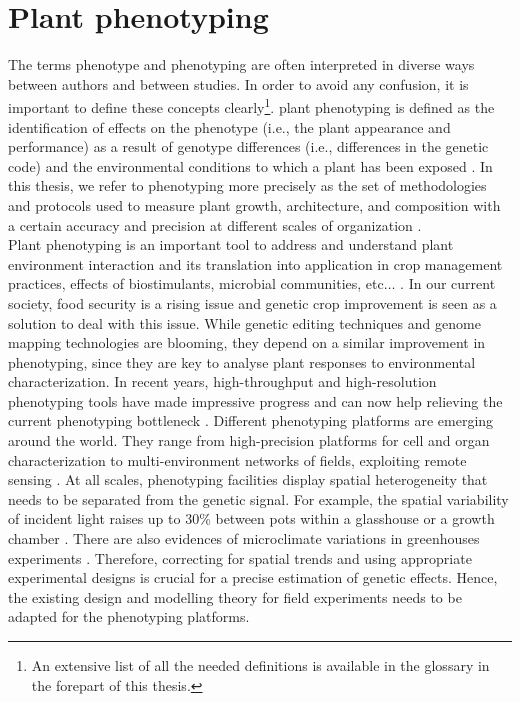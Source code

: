 \section{Plant phenotyping}
The terms phenotype and phenotyping are often interpreted in diverse ways between authors and between studies. In order to avoid any confusion, it is important to define these concepts clearly\footnote{An extensive list of all the needed definitions is available in the glossary in the forepart of this thesis.}.
plant phenotyping is defined as the identification of effects on the phenotype (i.e., the plant appearance and performance) as a result of genotype differences (i.e., differences in the genetic code) and the environmental conditions to which a plant has been exposed \parencite{houle_phenomics:_2010,fiorani_future_2013}. In this thesis, we refer to phenotyping more precisely as the set of methodologies and protocols used to measure plant growth, architecture, and composition with a certain accuracy and precision at different scales of organization \parencite{fiorani_future_2013}.\\
Plant phenotyping is an important tool to address and understand plant environment interaction and its translation into
application in crop management practices, effects of biostimulants, microbial communities, etc$\ldots$
\parencite{pieruschka2019plant}. 
In our current society, food security is a rising issue and genetic crop improvement is seen as a solution to deal with this issue. While genetic editing techniques and genome mapping technologies are blooming, they depend on a similar improvement in phenotyping, since they are key to analyse plant responses to environmental characterization.
In recent years, high-throughput and high-resolution phenotyping tools have made impressive progress and can now help relieving the current phenotyping bottleneck \parencite{tardieu_plant_2017,fiorani_future_2013,furbank_phenomics_2011}.
Different phenotyping platforms are emerging around the world. They range from high-precision platforms for cell and organ characterization \parencite{vargas_mapping_2006} to multi-environment networks of fields, exploiting remote sensing \parencite{virlet_field_2017}. At all scales, phenotyping facilities display spatial heterogeneity that needs to be separated from the genetic signal. For example, the spatial variability of incident light raises up to 30\% between pots within a glasshouse or a growth chamber \parencite{cabrera-bosquet_high-throughput_2016}. There are also evidences of microclimate variations in greenhouses experiments \parencite{brien_accounting_2013}. Therefore, correcting for spatial trends and using appropriate experimental designs is crucial for a precise estimation of genetic effects. Hence, the existing design and modelling theory for field experiments needs to be adapted for the phenotyping platforms.\\

